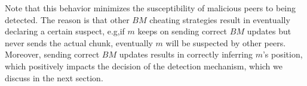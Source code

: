 
Note that this behavior minimizes the susceptibility of malicious peers to being detected.
The reason is that other $BM$ cheating strategies result in eventually declaring a certain suspect, e.g,if $m$ keeps on sending correct $BM$ updates but never sends the actual chunk, eventually $m$ will be suspected by other peers.
Moreover, sending correct $BM$ updates results in correctly inferring $m$'s position, which positively impacts the decision of the detection mechanism, which we discuss in the next section. 


% 




